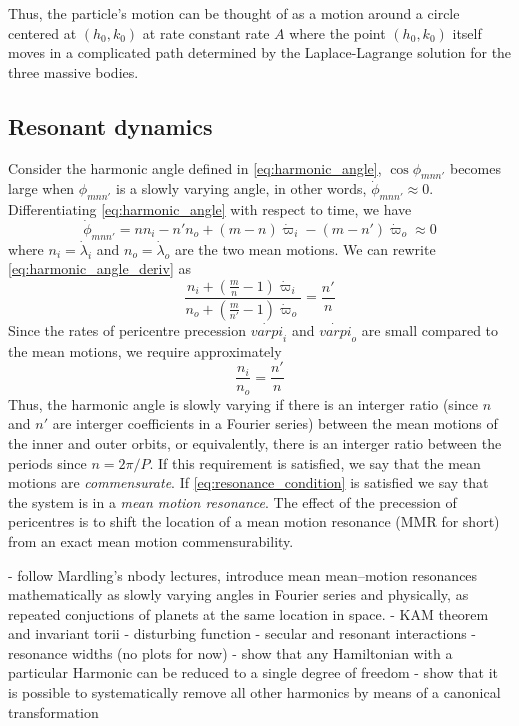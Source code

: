 Thus, the particle's motion can be thought of as a motion around 
a circle centered at $(h_0,k_0)$ at rate constant rate $A$ where
the point $(h_0,k_0)$ itself moves in a complicated path determined
by the Laplace-Lagrange solution for the three massive bodies. 

\subsection{Resonant dynamics}
\label{sub:Resonant_dynamics}
Consider the harmonic angle defined in \cref{eq:harmonic_angle}, 
$\cos\phi_{mnn'}$ becomes large when $\phi_{mnn'}$ is a slowly
varying angle, in other words, $\dot{\phi}_{mnn'}\approx 0$. 
Differentiating \cref{eq:harmonic_angle} with respect to time,
we have
\begin{equation}
    \dot{\phi}_{mnn'}=nn_i-n'n_o+(m-n)\dot{\varpi}_i-(m-n')\dot{
        \varpi}_o\approx 0
    \label{eq:harmonic_angle_deriv}
\end{equation}
where $n_i=\dot{\lambda}_i$ and $n_o=\dot{\lambda}_o$ are the two
mean motions. We can rewrite \cref{eq:harmonic_angle_deriv} as
\begin{equation}
    \frac{n_i+( \frac{m}{n} -1)\dot{\varpi}_i}
    {n_o + ( \frac{m}{n'}-1)\dot{\varpi}_o } 
    = \frac{n'}{n} 
    \label{eq:resonance_condition}
\end{equation}
Since the rates of pericentre precession $\dot{varpi}_i$ 
and $\dot{varpi}_o$ are small compared to the mean motions, we
require approximately
\begin{equation}
    \frac{n_i}{n_o} = \frac{n'}{n} 
\end{equation}
Thus, the harmonic angle is slowly varying if there is an interger 
ratio (since $n$ and $n'$ are interger coefficients in a Fourier 
series) between the mean motions of
the inner and outer orbits, or equivalently, there is an interger
ratio between the periods since $n=2\pi/P$. If this 
requirement is satisfied, we say that the mean motions
are \emph{commensurate}. If \cref{eq:resonance_condition} is 
satisfied we say that the system is in a \emph{mean motion resonance}.
The effect of the precession of pericentres is to shift the location
of a mean motion resonance (MMR for short) from an exact 
mean motion commensurability.


- follow Mardling's nbody lectures, introduce mean mean--motion
resonances mathematically as slowly varying angles in  Fourier series
and physically, as repeated conjuctions of planets at the same location
in space.
- KAM theorem and invariant torii
- disturbing function
- secular and resonant interactions
- resonance widths (no plots for now)
- show that any Hamiltonian with a particular Harmonic can be reduced to
a single degree of freedom
- show that it is possible to systematically remove all other harmonics
by means of a canonical transformation
